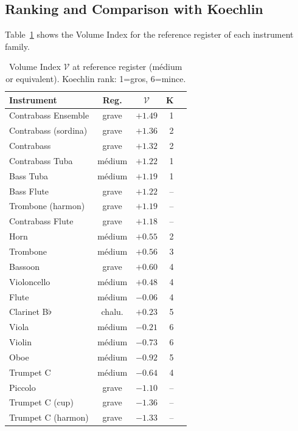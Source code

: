 \documentclass[journal]{IEEEtran}
\begin{document}
\subsection{Ranking and Comparison with Koechlin}

Table~\ref{tab:volume_top} shows the Volume Index for the reference register of each instrument family.

\begin{table}[!t]
\centering
\caption{Volume Index $\mathcal{V}$ at reference register (médium or equivalent). Koechlin rank: 1=gros, 6=mince.}
\label{tab:volume_top}
\small
\begin{tabular}{@{}lccrc@{}}
\toprule
\textbf{Instrument} & \textbf{Reg.} & $\mathcal{V}$ & \textbf{K} \\
\midrule
Contrabass Ensemble     & grave   & $+1.49$ & 1 \\
Contrabass (sordina)    & grave   & $+1.36$ & 2 \\
Contrabass              & grave   & $+1.32$ & 2 \\
Contrabass Tuba         & médium  & $+1.22$ & 1 \\
Bass Tuba               & médium  & $+1.19$ & 1 \\
Bass Flute              & grave   & $+1.22$ & -- \\
Trombone (harmon)       & grave   & $+1.19$ & -- \\
Contrabass Flute        & grave   & $+1.18$ & -- \\
Horn                    & médium  & $+0.55$ & 2 \\
Trombone                & médium  & $+0.56$ & 3 \\
Bassoon                 & grave   & $+0.60$ & 4 \\
Violoncello             & médium  & $+0.48$ & 4 \\
Flute                   & médium  & $-0.06$ & 4 \\
Clarinet B$\flat$       & chalu.  & $+0.23$ & 5 \\
Viola                   & médium  & $-0.21$ & 6 \\
Violin                  & médium  & $-0.73$ & 6 \\
Oboe                    & médium  & $-0.92$ & 5 \\
Trumpet C               & médium  & $-0.64$ & 4 \\
Piccolo                 & grave   & $-1.10$ & -- \\
Trumpet C (cup)         & grave   & $-1.36$ & -- \\
Trumpet C (harmon)      & grave   & $-1.33$ & -- \\
\bottomrule
\end{tabular}
\end{table}
\end{document}
